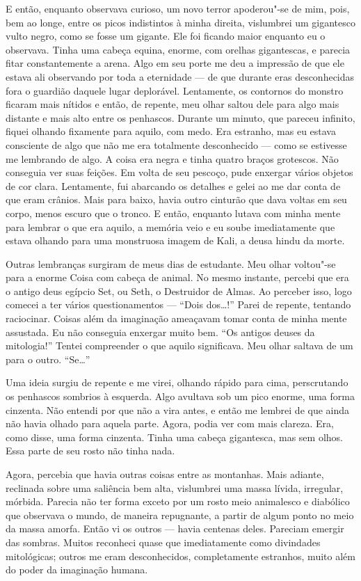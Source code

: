 E então, enquanto observava curioso, um novo terror apoderou"-se de mim, pois, bem ao longe, entre os picos indistintos
à minha direita, vislumbrei um gigantesco vulto negro, como se fosse um gigante. Ele foi ficando maior enquanto eu o
observava. Tinha uma cabeça equina, enorme, com orelhas gigantescas, e parecia fitar constantemente a arena. Algo em
seu porte me deu a impressão de que ele estava ali observando por toda a eternidade --- de que durante eras desconhecidas 
fora o guardião daquele lugar deplorável. Lentamente, os contornos do monstro ficaram mais nítidos e então, de
repente, meu olhar saltou dele para algo mais distante e mais alto entre os penhascos. Durante um minuto, que pareceu
infinito, fiquei olhando fixamente para aquilo, com medo. Era estranho, mas eu estava consciente de algo que não me era
totalmente desconhecido --- como se estivesse me lembrando de algo. A coisa era negra e tinha quatro braços grotescos.
Não conseguia ver suas feições. Em volta de seu pescoço, pude enxergar vários objetos de cor clara. Lentamente,
fui abarcando os detalhes e gelei ao me dar conta de que eram crânios. Mais para baixo, havia outro cinturão que dava
voltas em seu corpo, menos escuro que o tronco. E então, enquanto lutava com minha mente para lembrar o que era aquilo,
a memória veio e eu soube imediatamente que estava olhando para uma monstruosa imagem de Kali, a deusa hindu da morte.

Outras lembranças surgiram de meus dias de estudante. Meu olhar voltou"-se para a enorme Coisa com cabeça de animal. No
mesmo instante, percebi que era o antigo deus egípcio Set, ou Seth, o Destruidor de Almas. Ao perceber isso, logo
comecei a ter vários questionamentos --- ``Dois dos\ldots{}!'' Parei de repente, tentando raciocinar. Coisas além da imaginação
ameaçavam tomar conta de minha mente assustada. Eu não conseguia enxergar muito bem. ``Os antigos deuses da mitologia!''
Tentei compreender o que aquilo significava. Meu olhar saltava de um para o outro. ``Se\ldots{}''

Uma ideia surgiu de repente e me virei, olhando rápido para cima, perscrutando os penhascos sombrios à esquerda. Algo
avultava sob um pico enorme, uma forma cinzenta. Não entendi por que não a vira antes, e então me lembrei de que ainda
não havia olhado para aquela parte. Agora, podia ver com mais clareza. Era, como disse, uma forma cinzenta. Tinha uma
cabeça gigantesca, mas sem olhos. Essa parte de seu rosto não tinha nada.

Agora, percebia que havia outras coisas entre as montanhas. Mais adiante, reclinada sobre uma saliência bem alta,
vislumbrei uma massa lívida, irregular, mórbida. Parecia não ter forma exceto por um rosto meio animalesco e diabólico
que observava o mundo, de maneira repugnante, a partir de algum ponto no meio da massa amorfa. Então vi os outros ---
havia centenas deles. Pareciam emergir das sombras. Muitos reconheci quase que imediatamente como divindades
mitológicas; outros me eram desconhecidos, completamente estranhos, muito além do poder da imaginação humana.

